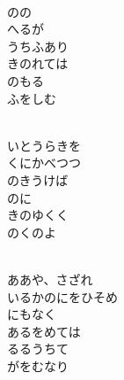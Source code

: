 \documentclass[10pt,b5j]{tarticle} %
\begin{document}
\vspace{1.5em} %
\newcommand{\linespace}{0.5em} %
\newcommand{\blocksize}{0.5\hsize} %
\newcommand{\itemmargin}{3em} %
\begin{enumerate} %
    \setlength{\itemindent}{\itemmargin} %
    \begin{minipage}[c]{\blocksize}
    
        \vspace{\linespace}
        \item~\\
        のの\\
        へるが\\
        うちふあり\\
        きのれては\\
        のもる\\
        ふをしむ
        
    \end{minipage}
    \begin{minipage}[c]{\blocksize}
        
        \vspace{\linespace}
        \item~\\
        いとうらきを\\
        くにかべつつ\\
        のきうけば\\
        のに\\
        きのゆくく\\
        のくのよ
        
    \end{minipage}
    \begin{minipage}[c]{\blocksize}
        
        \vspace{\linespace}
        \item~\\
        ああや、さざれ\\
        いるかのにをひそめ\\
        にもなく\\
        あるをめては\\
        るるうちて\\
        がをむなり
        

\end{minipage}
\end{enumerate}
\end{document}
